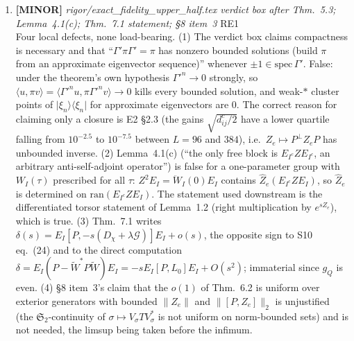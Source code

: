 \documentclass[11pt]{article}
\begin{document}
\begin{enumerate}[leftmargin=1.6em,itemsep=6pt]
\item \textbf{[MINOR]} \emph{rigor/exact\_fidelity\_upper\_half.tex verdict box after Thm.~5.3; Lemma~4.1(c); Thm.~7.1 statement; \S8 item~3} \hfill\textsc{RE1}\\ Four local defects, none load-bearing. (1) The verdict box claims compactness is necessary and that ``\(\Gamma'\pi\Gamma'=\pi\) has nonzero bounded solutions (build \(\pi\) from an approximate eigenvector sequence)'' whenever \(\pm1\in\mathrm{spec}\,\Gamma'\). False: under the theorem's own hypothesis \(\Gamma'^n\to0\) strongly, so \(\langle u,\pi v\rangle=\langle\Gamma'^nu,\pi\Gamma'^nv\rangle\to0\) kills every bounded solution, and weak-\(*\) cluster points of \(\lvert\xi_n\rangle\langle\xi_n\rvert\) for approximate eigenvectors are \(0\). The correct reason for claiming only a closure is E2 \S2.3 (the gains \(\sqrt{d^c_{ij}/2}\) have a lower quartile falling from \(10^{-2.5}\) to \(10^{-7.5}\) between \(L=96\) and \(384\)), i.e.\ \(Z_e\mapsto P^{\perp}Z_eP\) has unbounded inverse. (2) Lemma~4.1(c) (``the only free block is \(E_{I^c}ZE_{I^c}\), an arbitrary anti-self-adjoint operator'') is false for a one-parameter group with \(W_I(\tau)\) prescribed for all \(\tau\): \(Z^2E_I=\ddot W_I(0)E_I\) contains \(\widehat Z_e(E_{I^c}ZE_I)\), so \(\widehat Z_e\) is determined on \(\mathrm{ran}(E_{I^c}ZE_I)\). The statement used downstream is the differentiated torsor statement of Lemma~1.2 (right multiplication by \(e^{sZ_e}\)), which is true. (3) Thm.~7.1 writes \(\delta(s)=E_I[P,-s(D_\chi+\lambda\mathcal G)]E_I+o(s)\), the opposite sign to S10 eq.~(24) and to the direct computation \(\delta=E_I(P-\widetilde W^{*}P\widetilde W)E_I=-sE_I[P,L_0]E_I+O(s^2)\); immaterial since \(g_Q\) is even. (4) \S8 item~3's claim that the \(o(1)\) of Thm.~6.2 is uniform over exterior generators with bounded \(\lVert Z_e\rVert\) and \(\lVert[P,Z_e]\rVert_2\) is unjustified (the \(\mathfrak S_2\)-continuity of \(\sigma\mapsto V_\sigma TV_\sigma^{*}\) is not uniform on norm-bounded sets) and is not needed, the limsup being taken before the infimum.

\end{enumerate}
\end{document}
